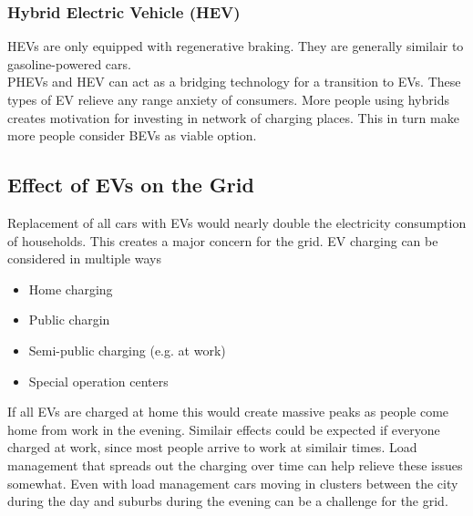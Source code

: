 \subsubsection{Hybrid Electric Vehicle (HEV)}
HEVs are only equipped with regenerative braking.
They are generally similair to gasoline-powered cars.\\

PHEVs and HEV can act as a bridging technology for a transition to EVs.
These types of EV relieve any range anxiety of consumers.
More people using hybrids creates motivation for investing in network of charging places.
This in turn make more people consider BEVs as viable option.

\subsection{Effect of EVs on the Grid}
Replacement of all cars with EVs would nearly double the electricity consumption of households.
This creates a major concern for the grid.
EV charging can be considered in multiple ways

\begin{itemize}
    \item Home charging
    \item Public chargin
    \item Semi-public charging (e.g. at work)
    \item Special operation centers
\end{itemize}

If all EVs are charged at home this would create massive peaks as people come home from work in the evening.
Similair effects could be expected if everyone charged at work, since most people arrive to work at similair times.
Load management that spreads out the charging over time can help relieve these issues somewhat.
Even with load management cars moving in clusters between the city during the day and suburbs during the evening can be a challenge for the grid.



